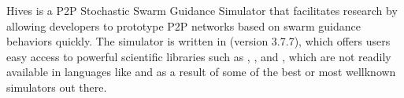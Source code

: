 \documentclass[letterpaper,10pt,english]{sphinxmanual}
\begin{document}
Hives is a P2P Stochastic Swarm Guidance Simulator that facilitates
research by allowing developers to prototype P2P networks based on swarm
guidance behaviors quickly. The simulator is written in  (version 3.7.7),
which offers users easy access to powerful scientific libraries such as ,
, and , which are not readily available in languages like 
and as a result of some of the best or most well\sphinxhyphen{}known simulators out there.

 
\end{document}
